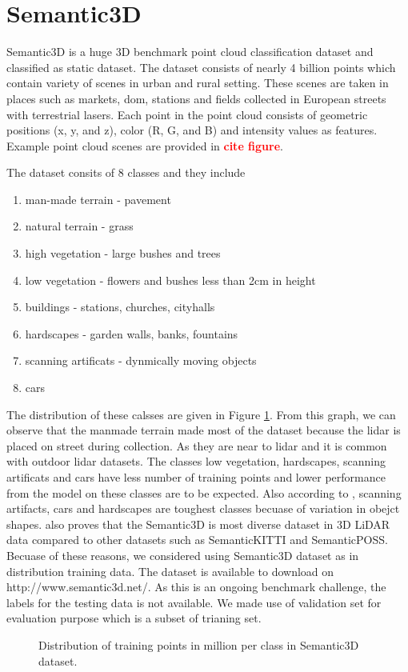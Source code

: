\newpage
\section{Semantic3D}
Semantic3D is a huge 3D benchmark point cloud classification dataset and classified as static dataset.
The dataset consists of nearly 4 billion points which contain variety of scenes in urban and rural setting.
These scenes are taken in places such as markets, dom, stations and fields collected in European streets with terrestrial lasers.
Each point in the point cloud consists of geometric positions (x, y, and z), color (R, G, and B) and intensity values as features.
Example point cloud scenes are provided in \textcolor{red}{\textbf{cite figure}}. 

The dataset consits of 8 classes and they include
\begin{enumerate}
    \item man-made terrain - pavement
    \item natural terrain - grass
    \item high vegetation - large bushes and trees
    \item low vegetation - flowers and bushes less than 2cm in height
    \item buildings - stations, churches, cityhalls
    \item hardscapes - garden walls, banks, fountains
    \item scanning artificats - dynmically moving objects
    \item cars
\end{enumerate}
The distribution of these calsses are given in Figure \ref{fig:sem3ddist}.
From this graph, we can observe that the manmade terrain made most of the dataset because the lidar is placed on street during collection.
As they are near to lidar and it is common with outdoor lidar datasets.
The classes low vegetation, hardscapes, scanning artificats and cars have less number of training points and lower performance from the model on these classes are to be expected.
Also according to \cite{hackel2017semantic3d}, scanning artifacts, cars and hardscapes are toughest classes becuase of variation in obejct shapes.
\cite{survey3d} also proves that the Semantic3D is most diverse dataset in 3D LiDAR data compared to other datasets such as SemanticKITTI and SemanticPOSS.
Becuase of these reasons, we considered using Semantic3D dataset as in distribution training data.
The dataset is available to download on http://www.semantic3d.net/. 
As this is an ongoing benchmark challenge, the labels for the testing data is not available.
We made use of validation set for evaluation purpose which is a subset of trianing set.
\begin{figure}[h!]
    \centering
    
    \caption{Distribution of training points in million per class in Semantic3D dataset.}
    \label{fig:sem3ddist}
\end{figure}

